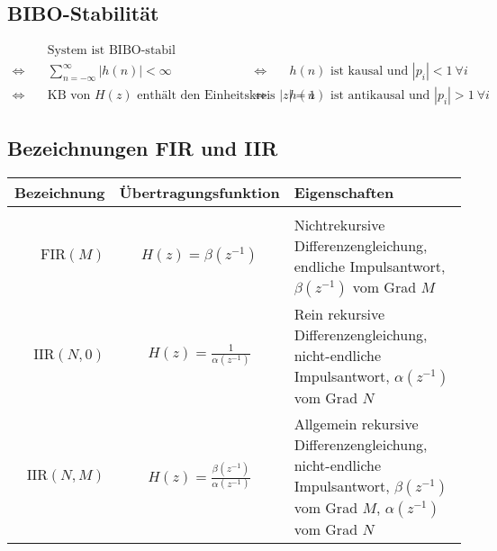 \documentclass[10pt,a4paper]{article}
\begin{document}
\subsection*{BIBO-Stabilität}
\begin{align*}
	& \text{System ist BIBO-stabil} \\
	\Leftrightarrow \quad & \textstyle \sum_{n=-\infty}^\infty |h(n)| < \infty
	& \Leftrightarrow \quad & \text{$h(n)$ ist kausal und $|p_i| < 1 ~ \forall i$} \\
	\Leftrightarrow \quad & \text{KB von $H(z)$ enthält den Einheitskreis $|z| = 1$}
	& \Leftrightarrow \quad & \text{$h(n)$ ist antikausal und $|p_i| > 1 ~ \forall i$}
\end{align*}

\subsection*{Bezeichnungen FIR und IIR}
\begin{center}
	\begin{tabular}{r c p{8cm}}
		\textbf{Bezeichnung} & \textbf{Übertragungsfunktion} & \textbf{Eigenschaften} \\ \hline \\[-1.0em]
		$\mathrm{FIR}(M)$ & $H(z) = \beta \left(z^{-1} \right)$ & Nichtrekursive Differenzengleichung, endliche Impulsantwort, $\beta \left(z^{-1} \right)$ vom Grad $M$ \\
		$\mathrm{IIR}(N, 0)$ & $H(z) = \frac{1}{\alpha \left(z^{-1} \right)}$ & Rein rekursive Differenzengleichung, nicht-endliche Impulsantwort, $\alpha \left( z^{-1} \right)$ vom Grad $N$ \\
		$\mathrm{IIR}(N, M)$ & $H(z) = \frac{\beta \left(z^{-1} \right)}{\alpha \left(z^{-1} \right)}$ & Allgemein rekursive Differenzengleichung, nicht-endliche Impulsantwort, $\beta \left(z^{-1} \right)$ vom Grad $M$, $\alpha \left( z^{-1} \right)$ vom Grad $N$
	\end{tabular}
\end{center}
\end{document}

